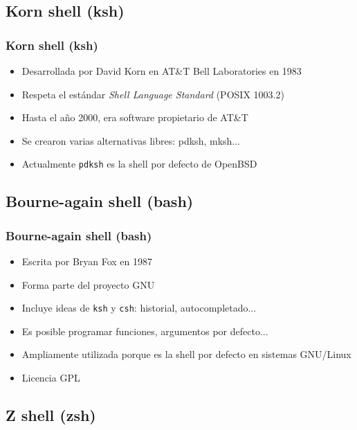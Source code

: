 \documentclass{beamer}
\begin{document}
\subsection{Korn shell (ksh)}

\begin{frame}
  \frametitle{Korn shell (ksh)}
  \begin{itemize}
    \item Desarrollada por David Korn en AT\&T Bell Laboratories en 1983
    \item Respeta el estándar \textit{Shell Language Standard} (POSIX 1003.2)
    \medskip
    \item Hasta el año 2000, era software propietario de AT\&T
    \item Se crearon varias alternativas libres: pdksh, mksh...
    \medskip
    \item Actualmente \texttt{pdksh} es la shell por defecto de OpenBSD
  \end{itemize}
\end{frame}

\subsection{Bourne-again shell (bash)}

\begin{frame}
  \frametitle{Bourne-again shell (bash)}
  \begin{itemize}
    \item Escrita por Bryan Fox en 1987
    \item Forma parte del proyecto GNU
    \medskip
    \item Incluye ideas de \texttt{ksh} y \texttt{csh}: historial, autocompletado...
    \item Es posible programar funciones, argumentos por defecto...
    \medskip
    \item Ampliamente utilizada porque es la shell por defecto en sistemas GNU/Linux
    \medskip
    \item Licencia GPL
  \end{itemize}
\end{frame}

\subsection{Z shell (zsh)}
\end{document}
